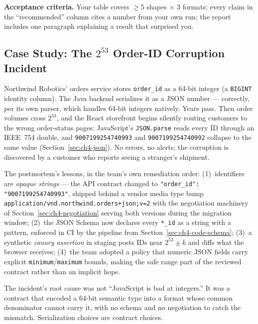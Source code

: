 \textbf{Acceptance criteria.} Your table covers $\ge 5$ shapes $\times$ 3 formats;
every claim in the ``recommended'' column cites a number from your own run; the
report includes one paragraph explaining a result that surprised you.

\subsection{Case Study: The $2^{53}$ Order-ID Corruption Incident}

Northwind Robotics' orders service stores \texttt{order\_id} as a 64-bit integer
(a \texttt{BIGINT} identity column). The Java backend serializes it as a JSON
number --- correctly, per its own parser, which handles 64-bit integers natively.
Years pass. Then order volumes cross $2^{53}$, and the React storefront begins
silently routing customers to the wrong order-status pages: JavaScript's
\texttt{JSON.parse} reads every ID through an IEEE~754 double, and
\texttt{9007199254740993} and \texttt{9007199254740992} collapse to the same value
(Section~\ref{sec:ch4-json}). No errors, no alerts; the corruption is discovered
by a customer who reports seeing a stranger's shipment.

The postmortem's lessons, in the team's own remediation order: (1)~identifiers are
\emph{opaque strings} --- the API contract changed to
\texttt{"order\_id": "9007199254740993"}, shipped behind a vendor media type bump
\texttt{application/vnd.northwind.orders+json;v=2} with the negotiation machinery
of Section~\ref{sec:ch4-negotiation} serving both versions during the migration
window; (2)~the JSON Schema now declares every \texttt{*\_id} as a string with a
pattern, enforced in CI by the pipeline from Section~\ref{sec:ch4-code-schema};
(3)~a synthetic \emph{canary assertion} in staging posts IDs near $2^{53} \pm k$
and diffs what the browser receives; (4)~the team adopted a policy that numeric
JSON fields carry explicit \texttt{minimum}/\texttt{maximum} bounds, making the
safe range part of the reviewed contract rather than an implicit hope.

\begin{warningbox}
The incident's root cause was not ``JavaScript is bad at integers.'' It was a
contract that encoded a 64-bit semantic type into a format whose common
denominator cannot carry it, with no schema and no negotiation to catch the
mismatch. Serialization choices are contract choices.
\end{warningbox}

